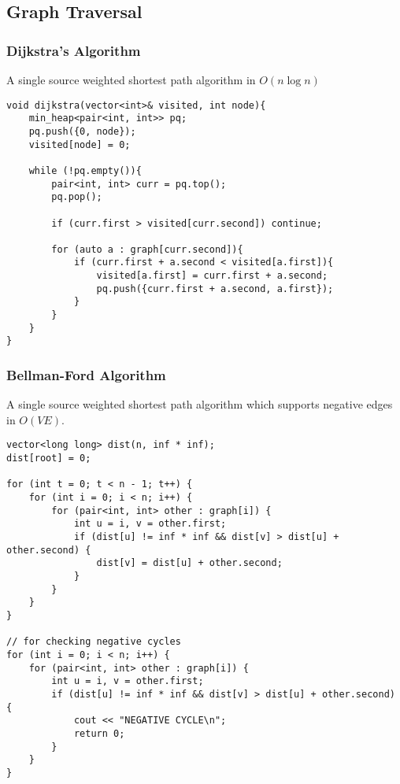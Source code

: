 \subsection{Graph Traversal}
\subsubsection{Dijkstra's Algorithm}
A single source weighted shortest path algorithm in $O(n\log n)$
\begin{lstlisting}
void dijkstra(vector<int>& visited, int node){
    min_heap<pair<int, int>> pq;
    pq.push({0, node});
    visited[node] = 0;

    while (!pq.empty()){
        pair<int, int> curr = pq.top();
        pq.pop();

        if (curr.first > visited[curr.second]) continue;
        
        for (auto a : graph[curr.second]){
            if (curr.first + a.second < visited[a.first]){
                visited[a.first] = curr.first + a.second;
                pq.push({curr.first + a.second, a.first});
            }
        }
    }
}
\end{lstlisting}
\subsubsection{Bellman-Ford Algorithm}
A single source weighted shortest path algorithm which supports negative edges in $O(VE)$.
\begin{lstlisting}
vector<long long> dist(n, inf * inf);
dist[root] = 0;

for (int t = 0; t < n - 1; t++) {
    for (int i = 0; i < n; i++) {
        for (pair<int, int> other : graph[i]) {
            int u = i, v = other.first;
            if (dist[u] != inf * inf && dist[v] > dist[u] + other.second) {
                dist[v] = dist[u] + other.second;
            }
        }
    }
}

// for checking negative cycles
for (int i = 0; i < n; i++) {
    for (pair<int, int> other : graph[i]) {
        int u = i, v = other.first;
        if (dist[u] != inf * inf && dist[v] > dist[u] + other.second) {
            cout << "NEGATIVE CYCLE\n";
            return 0;
        }
    }
}
\end{lstlisting}
